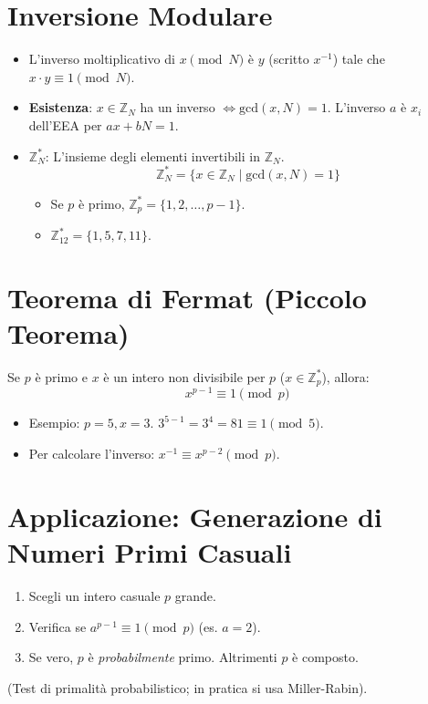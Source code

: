 \documentclass{article}
\begin{document}
\section{Inversione Modulare}
\begin{itemize}
    \item L'inverso moltiplicativo di $x \pmod N$ è $y$ (scritto $x^{-1}$) tale che $x \cdot y \equiv 1 \pmod N$.
    \item \textbf{Esistenza}: $x \in \mathbb{Z}_N$ ha un inverso $\iff \text{gcd}(x, N) = 1$.
    L'inverso $a$ è $x_i$ dell'EEA per $ax+bN=1$.
    \item \textbf{$\mathbb{Z}_N^*$}: L'insieme degli elementi invertibili in $\mathbb{Z}_N$.
    \[ \mathbb{Z}_N^* = \{x \in \mathbb{Z}_N \mid \text{gcd}(x,N) = 1 \} \]
    \begin{itemize}
        \item Se $p$ è primo, $\mathbb{Z}_p^* = \{1, 2, \dots, p-1\}$.
        \item $\mathbb{Z}_{12}^* = \{1, 5, 7, 11\}$.
    \end{itemize}
\end{itemize}

\section{Teorema di Fermat (Piccolo Teorema)}
Se $p$ è primo e $x$ è un intero non divisibile per $p$ ($x \in \mathbb{Z}_p^*$), allora:
\[ x^{p-1} \equiv 1 \pmod p \]
\begin{itemize}
    \item Esempio: $p=5, x=3$. $3^{5-1} = 3^4 = 81 \equiv 1 \pmod 5$.
    \item Per calcolare l'inverso: $x^{-1} \equiv x^{p-2} \pmod p$.
\end{itemize}

\section{Applicazione: Generazione di Numeri Primi Casuali}
\begin{enumerate}
    \item Scegli un intero casuale $p$ grande.
    \item Verifica se $a^{p-1} \equiv 1 \pmod p$ (es. $a=2$).
    \item Se vero, $p$ è \textit{probabilmente} primo. Altrimenti $p$ è composto.
\end{enumerate}
(Test di primalità probabilistico; in pratica si usa Miller-Rabin).
\end{document}
